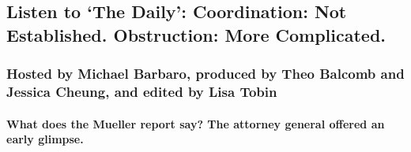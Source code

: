 \hypertarget{listen-to-the-daily-coordination-not-established-obstruction-more-complicated-1}{%
\subsection{Listen to `The Daily': Coordination: Not Established.
Obstruction: More
Complicated.}\label{listen-to-the-daily-coordination-not-established-obstruction-more-complicated-1}}

\hypertarget{hosted-by-michael-barbaro-produced-by-theo-balcomb-and-jessica-cheung-and-edited-by-lisa-tobin}{%
\subsubsection{Hosted by Michael Barbaro, produced by Theo Balcomb and
Jessica Cheung, and edited by Lisa
Tobin}\label{hosted-by-michael-barbaro-produced-by-theo-balcomb-and-jessica-cheung-and-edited-by-lisa-tobin}}

\hypertarget{what-does-the-mueller-report-say-the-attorney-general-offered-an-early-glimpse}{%
\paragraph{What does the Mueller report say? The attorney general
offered an early
glimpse.}\label{what-does-the-mueller-report-say-the-attorney-general-offered-an-early-glimpse}}

